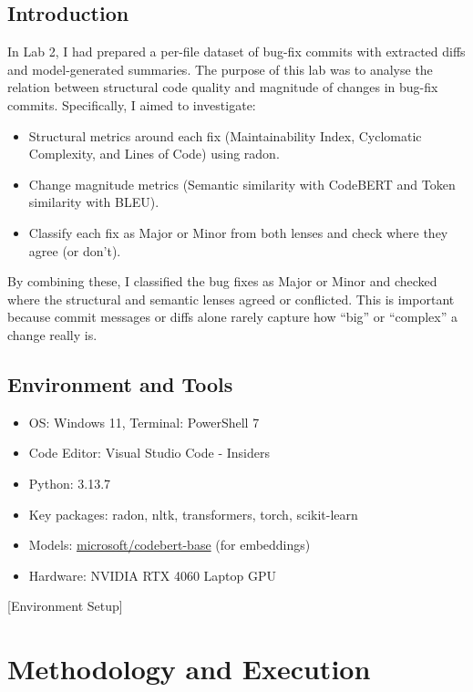 \documentclass[10pt,a4paper]{report}
\begin{document}
\subsection{Introduction}
In Lab 2, I had prepared a per-file dataset of bug-fix commits with extracted diffs and model-generated summaries. The purpose of this lab was to analyse the relation between structural code quality and magnitude of changes in bug-fix commits. Specifically, I aimed to investigate:
\begin{itemize}[itemsep=0em, topsep=0pt]
    \item Structural metrics around each fix (Maintainability Index, Cyclomatic Complexity, and Lines of Code) using radon.
    \item Change magnitude metrics (Semantic similarity with CodeBERT and Token similarity with BLEU).
    \item Classify each fix as Major or Minor from both lenses and check where they agree (or don’t).
\end{itemize}

By combining these, I classified the bug fixes as Major or Minor and checked where the structural and semantic lenses agreed or conflicted. This is important because commit messages or diffs alone rarely capture how “big” or “complex” a change really is.

\subsection{Environment and Tools}
\begin{itemize}[itemsep=0em, topsep=0pt]
    \item OS: Windows 11, Terminal: PowerShell 7
    \item Code Editor: Visual Studio Code - Insiders
    \item Python: 3.13.7
    \item Key packages: radon, nltk, transformers, torch, scikit-learn
    \item Models: \href{https://huggingface.co/microsoft/codebert-base}{microsoft/codebert-base} (for embeddings)
    \item Hardware: NVIDIA RTX 4060 Laptop GPU
\end{itemize}

[Environment Setup]

\section{Methodology and Execution}
\end{document}
